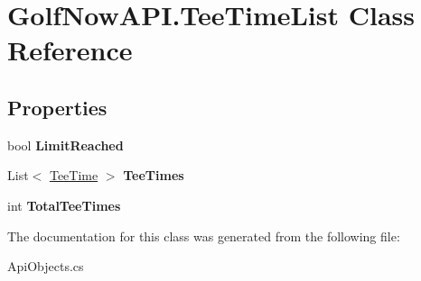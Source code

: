 \hypertarget{class_golf_now_a_p_i_1_1_tee_time_list}{}\section{Golf\+Now\+A\+P\+I.\+Tee\+Time\+List Class Reference}
\label{class_golf_now_a_p_i_1_1_tee_time_list}
\subsection*{Properties}
\begin{DoxyCompactItemize}
\item 
\mbox{\label{class_golf_now_a_p_i_1_1_tee_time_list_aab414eb86330408d1604b3e44fd319ed}} 
bool {\bfseries Limit\+Reached}
\item 
\mbox{\label{class_golf_now_a_p_i_1_1_tee_time_list_ab2a07f11fd45a797acafbef73a0ead1f}} 
List$<$ \mbox{\hyperlink{class_golf_now_a_p_i_1_1_tee_time}{Tee\+Time}} $>$ {\bfseries Tee\+Times}
\item 
\mbox{\label{class_golf_now_a_p_i_1_1_tee_time_list_a07480ebc68f5be65fb859317fe86283a}} 
int {\bfseries Total\+Tee\+Times}
\end{DoxyCompactItemize}


The documentation for this class was generated from the following file\+:\begin{DoxyCompactItemize}
\item 
Api\+Objects.\+cs\end{DoxyCompactItemize}

